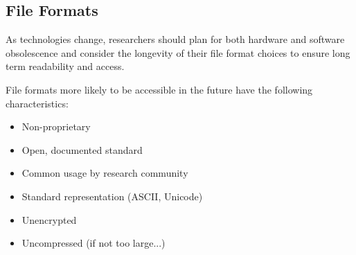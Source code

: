 \subsection{File Formats}
As technologies change, researchers should plan for both hardware and software obsolescence and consider the longevity of their file format choices to ensure long term readability and access.


File formats more likely to be accessible in the future have the following characteristics:
\begin{itemize}
  \item Non-proprietary
  \item Open, documented standard
  \item Common usage by research community
  \item Standard representation (ASCII, Unicode)
  \item Unencrypted
  \item Uncompressed (if not too large...)
\end{itemize}

